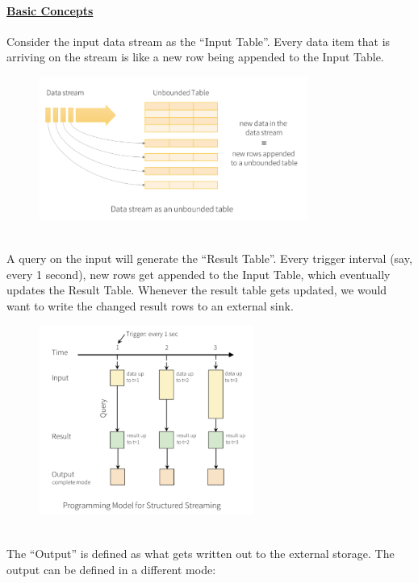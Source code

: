 \documentclass[10pt,a4paper]{article}
\begin{document}
 \paragraph{\uline{Basic Concepts}}
 Consider the input data stream as the “Input Table”. Every data item that is arriving on the stream is like a new row being appended to the Input Table.
   \begin{figure}[ht!]
 \hfill \includegraphics[width=250pt]{images/spark-data-stream}
 \hspace*{\fill}
 \end{figure} \\
 A query on the input will generate the “Result Table”. Every trigger interval (say, every 1 second), new rows get appended to the Input Table, which eventually updates the Result Table. Whenever the result table gets updated, we would want to write the changed result rows to an external sink.
    \begin{figure}[ht!]
 \hfill \includegraphics[width=200pt]{images/spark-basic-concept}
 \hspace*{\fill}
 \end{figure} \\
 The “Output” is defined as what gets written out to the external storage. The output can be defined in a different mode:
\end{document}
